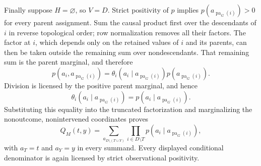 Finally suppose \(H=\varnothing\), so \(V=D\).  Strict positivity of \(p\) implies \(p(a_{\operatorname{pa}_G(i)})>0\) for every parent assignment.  Sum the causal product first over the descendants of \(i\) in reverse topological order; row normalization removes all their factors.  The factor at \(i\), which depends only on the retained values of \(i\) and its parents, can then be taken outside the remaining sum over nondescendants.  That remaining sum is the parent marginal, and therefore
\[
 p(a_i,a_{\operatorname{pa}_G(i)})
 =\theta_i(a_i\mid a_{\operatorname{pa}_G(i)})
  p(a_{\operatorname{pa}_G(i)}).
\]
Division is licensed by the positive parent marginal, and hence
\[
 \theta_i(a_i\mid a_{\operatorname{pa}_G(i)})
 =p(a_i\mid a_{\operatorname{pa}_G(i)}).
\]
Substituting this equality into the truncated factorization and marginalizing the nonoutcome, nonintervened coordinates proves
\[
 Q_M(t,y)
 =\sum_{a_{D\setminus(T\cup Y)}}
   \prod_{i\in D\setminus T}
   p(a_i\mid a_{\operatorname{pa}_G(i)}),
\]
with \(a_T=t\) and \(a_Y=y\) in every summand.  Every displayed conditional denominator is again licensed by strict observational positivity.
